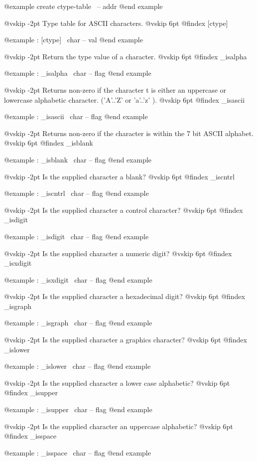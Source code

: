 @example
create ctype-table      \ -- addr @end example

@vskip -2pt
Type table for ASCII characters.
@vskip 6pt
@findex [ctype]

@example
: [ctype]       \ char -- val @end example

@vskip -2pt
Return the type value of a character.
@vskip 6pt
@findex _isalpha

@example
: _isalpha      \ char -- flag @end example

@vskip -2pt
Returns non-zero if the character t is either an uppercase or
lowercase alphabetic character. ('A'..'Z' or 'a'..'z' ).
@vskip 6pt
@findex _isascii

@example
: _isascii      \ char -- flag @end example

@vskip -2pt
Returns non-zero if the character is within the 7 bit
ASCII alphabet.
@vskip 6pt
@findex _isblank

@example
: _isblank      \ char -- flag @end example

@vskip -2pt
Is the supplied character a blank?
@vskip 6pt
@findex _iscntrl

@example
: _iscntrl      \ char -- flag @end example

@vskip -2pt
Is the supplied character a control character?
@vskip 6pt
@findex _isdigit

@example
: _isdigit      \ char -- flag @end example

@vskip -2pt
Is the supplied character a numeric digit?
@vskip 6pt
@findex _isxdigit

@example
: _isxdigit     \ char -- flag @end example

@vskip -2pt
Is the supplied character a hexadecimal digit?
@vskip 6pt
@findex _isgraph

@example
: _isgraph      \ char -- flag @end example

@vskip -2pt
Is the supplied character a graphics character?
@vskip 6pt
@findex _islower

@example
: _islower      \ char -- flag @end example

@vskip -2pt
Is the supplied character a lower case alphabetic?
@vskip 6pt
@findex _isupper

@example
: _isupper      \ char -- flag @end example

@vskip -2pt
Is the supplied character an uppercase alphabetic?
@vskip 6pt
@findex _isspace

@example
: _isspace      \ char -- flag @end example

